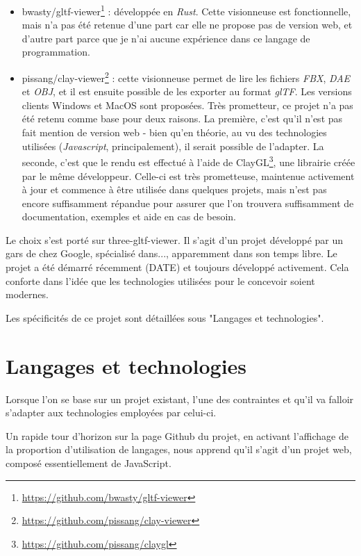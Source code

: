 \begin{itemize}
    \item bwasty/gltf-viewer\footnote{\url{https://github.com/bwasty/gltf-viewer}} : développée en \textit{Rust}. Cette visionneuse est fonctionnelle, mais n'a pas été retenue d'une part car elle ne propose pas de version web, et d'autre part parce que je n'ai aucune expérience dans ce langage de programmation.
    \item pissang/clay-viewer\footnote{\url{https://github.com/pissang/clay-viewer}} : cette visionneuse permet de lire les fichiers \textit{FBX}, \textit{DAE} et \textit{OBJ}, et il est ensuite possible de les exporter au format \textit{glTF}. Les versions clients Windows et MacOS sont proposées. Très prometteur, ce projet n'a pas été retenu comme base pour deux raisons. La première, c'est qu'il n'est pas fait mention de version web - bien qu'en théorie, au vu des technologies utilisées (\textit{Javascript}, principalement), il serait possible de l'adapter. La seconde, c'est que le rendu est effectué à l'aide de ClayGL\footnote{\url{https://github.com/pissang/claygl}}, une librairie créée par le même développeur. Celle-ci est très prometteuse, maintenue activement à jour et commence à être utilisée dans quelques projets, mais n'est pas encore suffisamment répandue pour assurer que l'on trouvera suffisamment de documentation, exemples et aide en cas de besoin.
\end{itemize}


Le choix s'est porté sur three-gltf-viewer.
Il s'agit d'un projet développé par un gars de chez Google, spécialisé dans...,  apparemment dans son temps libre.
Le projet a été démarré récemment (DATE) et toujours développé activement. Cela conforte dans l'idée que les technologies utilisées pour le concevoir soient modernes.

Les spécificités de ce projet sont détaillées sous "Langages et technologies".


\section{Langages et technologies}

Lorsque l'on se base sur un projet existant, l'une des contraintes et qu'il va falloir s'adapter aux technologies employées par celui-ci.

Un rapide tour d'horizon sur la page Github du projet, en activant l'affichage de la proportion d'utilisation de langages, nous apprend qu'il s'agit d'un projet web, composé essentiellement de JavaScript.

